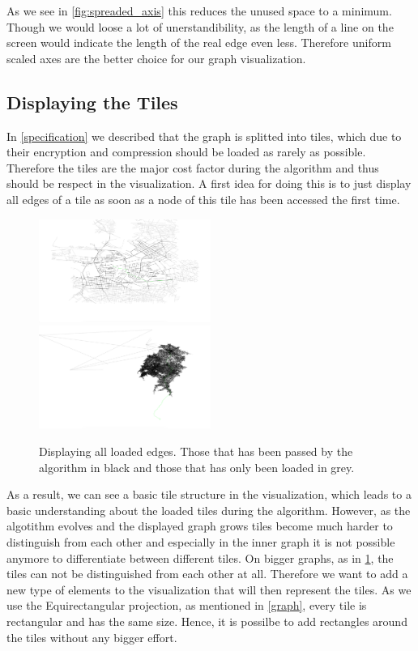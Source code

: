 \documentclass
[
	paper = a4,
    pagesize,
	12 pt,
	oneside,                       %
    open = right,
	DIV = calc,
	BCOR = 0 mm,                   %
	bibtotoc
]
{scrbook}
\begin{document}
As we see in \cref{fig:spreaded_axis} this reduces the unused space to a minimum.
Though we would loose a lot of unerstandibility, as the length of a line on the screen would indicate the length of the real edge even less.
Therefore uniform scaled axes are the better choice for our graph visualization.


\subsection{Displaying the Tiles} \label{tiles}

In \cref{specification} we described that the graph is splitted into tiles, which due to their encryption and compression should be loaded as rarely as possible.
Therefore the tiles are the major cost factor during the algorithm and thus should be respect in the visualization.
A first idea for doing this is to just display all edges of a tile as soon as a node of this tile has been accessed the first time.

\begin{figure}[H]
	\includegraphics[width=0.5\textwidth]{Images/vis-tile-blocks-small.png}
	\includegraphics[width=0.5\textwidth]{Images/vis-tile-blocks-big.png}
\caption[]{Displaying all loaded edges. Those that has been passed by the algorithm in black and those that has only been loaded in grey.}
\label{fig:basic_tiles}
\end{figure}

As a result, we can see a basic tile structure in the visualization, which leads to a basic understanding about the loaded tiles during the algorithm.
However, as the algotithm evolves and the displayed graph grows tiles become much harder to distinguish from each other and especially in the inner graph it is not possible anymore to differentiate between different tiles.
On bigger graphs, as in \cref{fig:basic_tiles}, the tiles can not be distinguished from each other at all.
Therefore we want to add a new type of elements to the visualization that will then represent the tiles.
As we use the Equirectangular projection, as mentioned in \cref{graph}, every tile is rectangular and has the same size.
Hence, it is possilbe to add rectangles around the tiles without any bigger effort.
\end{document}
